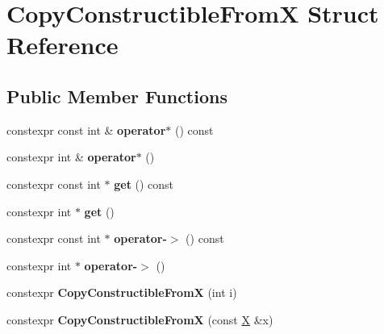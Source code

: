 \hypertarget{struct_copy_constructible_from_x}{}\section{Copy\+Constructible\+FromX Struct Reference}
\label{struct_copy_constructible_from_x}
\subsection*{Public Member Functions}
\begin{DoxyCompactItemize}
\item 
\mbox{\label{struct_copy_constructible_from_x_a0037506dc8e5cae96b07a9d528c8fab1}} 
constexpr const int \& {\bfseries operator$\ast$} () const
\item 
\mbox{\label{struct_copy_constructible_from_x_ade0b824a3d5b8db4ca06e8758d3e566d}} 
constexpr int \& {\bfseries operator$\ast$} ()
\item 
\mbox{\label{struct_copy_constructible_from_x_acb1e89e332f82acb5f79ac27c8a31fb9}} 
constexpr const int $\ast$ {\bfseries get} () const
\item 
\mbox{\label{struct_copy_constructible_from_x_aeabed3fd3234ae6694378120c4fc6921}} 
constexpr int $\ast$ {\bfseries get} ()
\item 
\mbox{\label{struct_copy_constructible_from_x_aa74eccd06d72007091cc94b04074241b}} 
constexpr const int $\ast$ {\bfseries operator-\/$>$} () const
\item 
\mbox{\label{struct_copy_constructible_from_x_aa3d8917a40c491f72150bac6db618e06}} 
constexpr int $\ast$ {\bfseries operator-\/$>$} ()
\item 
\mbox{\label{struct_copy_constructible_from_x_a7acd85ce9b856f686b982d7fbb7fe734}} 
constexpr {\bfseries Copy\+Constructible\+FromX} (int i)
\item 
\mbox{\label{struct_copy_constructible_from_x_a754bc5993788bfada5e7a2a539505cac}} 
constexpr {\bfseries Copy\+Constructible\+FromX} (const \mbox{\hyperlink{class_x}{X}} \&x)
\end{DoxyCompactItemize}
